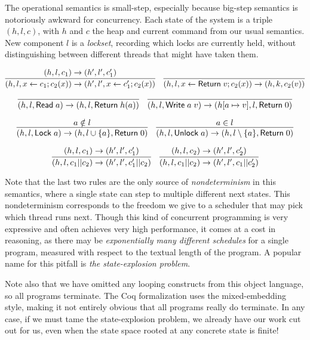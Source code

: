 \documentclass{amsbook}
\theoremstyle{definition}
\theoremstyle{remark}
\numberwithin{section}{chapter}
\numberwithin{equation}{chapter}
\begin{document}
The operational semantics is small-step, especially because big-step semantics is notoriously awkward for concurrency.
Each state of the system is a triple $(h, l, c)$, with $h$ and $c$ the heap and current command from our usual semantics.
New component $l$ is a \emph{lockset}, recording which locks are currently held, without distinguishing between different threads that might have taken them.

$$\infer{\smallstep{(h, l, x \leftarrow c_1; c_2(x))}{(h', l', x \leftarrow c'_1; c_2(x))}}{
  \smallstep{(h, l, c_1)}{(h', l', c'_1)}
}
\quad \infer{\smallstep{(h, l, x \leftarrow \mt{Return} \; v; c_2(x))}{(h, k, c_2(v))}}{}$$

$$\infer{\smallstep{(h, l, \mt{Read} \; a)}{(h, l, \mt{Return} \; \msel{h}{a})}}{}
\quad \infer{\smallstep{(h, l, \mt{Write} \; a \; v)}{(\mupd{h}{a}{v}, l, \mt{Return} \; 0)}}{}$$

$$\infer{\smallstep{(h, l, \mt{Lock} \; a)}{(h, l \cup \{a\}, \mt{Return} \; 0)}}{
  a \notin l
}
\quad \infer{\smallstep{(h, l, \mt{Unlock} \; a)}{(h, l \setminus \{a\}, \mt{Return} \; 0)}}{
  a \in l
}$$

$$\infer{\smallstep{(h, l, c_1 || c_2)}{(h', l', c'_1 || c_2)}}{
  \smallstep{(h, l, c_1)}{(h', l', c'_1)}
}
\quad \infer{\smallstep{(h, l, c_1 || c_2)}{(h', l', c_1 || c'_2)}}{
  \smallstep{(h, l, c_2)}{(h', l', c'_2)}
}$$

Note that the last two rules are the only source of \emph{nondeterminism} in this semantics, where a single state can step to multiple different next states.
This nondeterminism corresponds to the freedom we give to a scheduler that may pick which thread runs next.
Though this kind of concurrent programming is very expressive and often achieves very high performance, it comes at a cost in reasoning, as there may be \emph{exponentially many different schedules} for a single program, measured with respect to the textual length of the program.
A popular name for this pitfall is \emph{the state-explosion problem}.

Note also that we have omitted any looping constructs from this object language, so all programs terminate.
The Coq formalization uses the mixed-embedding style, making it not entirely obvious that all programs really do terminate.
In any case, if we must tame the state-explosion problem, we already have our work cut out for us, even when the state space rooted at any concrete state is finite!
\end{document}

